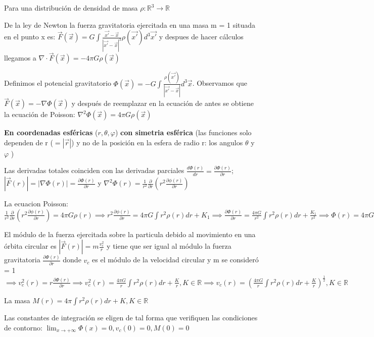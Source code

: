 \documentclass[12pt]{book}
\begin{document}
\begin{description}
\item Para una distribución de densidad de masa $\rho \colon \mathbb{R}^3 \to \mathbb{R}$
\item De la ley de Newton la fuerza gravitatoria ejercitada en una masa m = 1 situada en el punto x es:  $\vec{F}(\vec{x}) = G \int{\frac{\vec{x\prime} - \vec{x}}{|\vec{x\prime} - \vec{x}|^3}\rho(\vec{x\prime})d^3\vec{x\prime}} $ 
y despues de hacer cálculos llegamos a $ \nabla  \cdot  \vec{F}(\vec{x}) = -4\pi G \rho(\vec{x}) $
\item Definimos el potencial gravitatorio $\Phi(\vec{x}) = -G \int{\frac{\rho(\vec{x\prime})}{|\vec{x\prime} - \vec{x}|}d^3\vec{x}} $. 
Observamos que $\vec{F}(\vec{x}) = - \nabla \Phi(\vec{x}) $ 
y después de reemplazar en la ecuación de antes se obtiene la ecuación de Poisson: $\nabla^2 \Phi(\vec{x}) = 4\pi G \rho(\vec{x}) $
\item \textbf{En coordenadas esféricas} ($r,\theta,\varphi$) \textbf{con simetria esférica} 
(las funciones solo dependen de r ($=|\vec{r}|$) y no de la posición en la esfera de radio r: los angulos $\theta$ y $\varphi$ )

Las derivadas totales coinciden con las derivadas parciales $\frac {d\Phi(r)}{dr} = \frac{\partial \Phi(r)}{\partial r} $; 
$|\vec{F}(r)| = |\nabla \Phi(r)| = \frac{\partial \Phi(r)}{\partial r} $ y 
$\nabla^2 \Phi(r) = \frac{1}{r^2} \frac{\partial }{\partial r}(r^2 \frac{\partial \phi(r)}{\partial r})$
\item
La ecuacion Poisson:$ \frac{1}{r^2} \frac{\partial }{\partial r}(r^2 \frac{\partial \phi(r)}{\partial r}) = 4\pi G \rho(r) \implies
r^2 \frac{\partial \phi(r)}{\partial r} = 4\pi G \int{r^2\rho(r)dr} + K_1 \implies
\frac{\partial \Phi(r)}{\partial r} = \frac{4 \pi G}{r^2}\int{r^2\rho(r)dr} + \frac{K_1}{r^2}\implies
\Phi(r) = 4\pi G \int{\frac{1}{r^2}(\int{r^2\rho(r)dr})dr } + K_1\int{\frac{1}{r^2}dr} + K_2
=4\pi G \int{\frac{1}{r^2}(\int{r^2\rho(r)dr})dr } + \frac{K_1}{r} + K_2, K_1, K_2 \in \mathbb{R} (el signo - con K_1)
 $
\item El módulo de la fuerza ejercitada sobre la particula debido al movimiento en una órbita circular es $ |\vec{F}(r)| = m \frac{v_c^2}{r} $ y tiene que ser igual al  módulo la fuerza gravitatoria $\frac{\partial \Phi(r)}{\partial r}$
donde $v_c$ es el módulo de la velocidad circular y m se consideró = 1
$ \implies v_c^2(r) = r\frac{\partial \Phi(r)}{\partial r} \implies
v_c^2(r) = \frac{4\pi G}{r}\int{r^2\rho(r)dr} + \frac{K}{r}, K \in \mathbb{R} \implies 
v_c(r) = (\frac{4 \pi G}{r}\int{r^2\rho(r)dr} + \frac{K}{r})^{\frac{1}{2}}, K \in \mathbb{R}
$
\item La masa $M(r) = 4 \pi \int{r^2\rho(r)dr} + K, K \in \mathbb{R}$
\item Las constantes de integración se eligen de tal forma que verifiquen las condiciones de contorno:
 $\lim_{x \to +\infty}\Phi(x) = 0, v_c(0) = 0, M(0) = 0$


\end{description}
\end{document}
